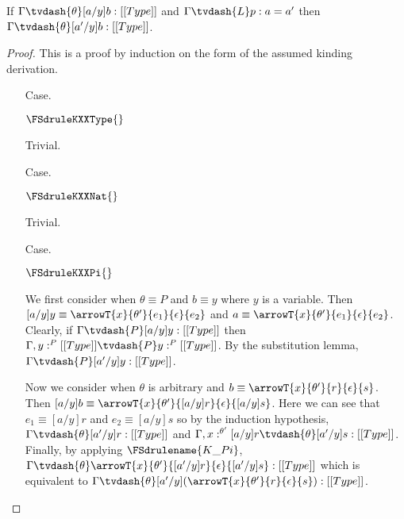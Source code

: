 \begin{lemma}
  \label{lemma:kinding_conversion}
  If $\Gamma \tvdash{\theta} [a/y]b:[[Type]]$ and $\Gamma \tvdash{L} p:a = a'$ then
  $\Gamma \tvdash{\theta} [a'/y]b:[[Type]]$.
\end{lemma}
\begin{proof}
  This is a proof by induction on the form of the assumed kinding derivation.
  \begin{itemize}
  \item[Case.] \ \\
    \begin{center}
      $\FSdruleKXXType{}$ 
    \end{center}
    Trivial.
    
  \item[Case.] \ \\
    \begin{center}
      $\FSdruleKXXNat{}$
    \end{center}
    Trivial.
    
  \item[Case.] \ \\
    \begin{center}
      $\FSdruleKXXPi{}$
    \end{center}
    We first consider when $\theta \equiv P$ and $b \equiv y$ where $y$ is a variable.  Then
    $[a/y]y \equiv \arrowT{x}{\theta'}{e_1}{\epsilon}{e_2}$ and 
    $a \equiv \arrowT{x}{\theta'}{e_1}{\epsilon}{e_2}$.  Clearly, if 
    $\Gamma \tvdash{P} [a/y]y:[[Type]]$ then $\Gamma, y:^P [[Type]] \tvdash{P} y:^P [[Type]]$.  By
    the substitution lemma, $\Gamma \tvdash{P} [a'/y]y:[[Type]]$.

    Now we consider when $\theta$ is arbitrary and 
    $b \equiv \arrowT{x}{\theta'}{r}{\epsilon}{s}$.
    Then $[a/y]b \equiv \arrowT{x}{\theta'}{[a/y]r}{\epsilon}{[a/y]s}$.  Here we can see that
    $e_1 \equiv [a/y]r$ and $e_2 \equiv [a/y]s$ so by the induction 
    hypothesis, $\Gamma \tvdash{\theta} [a'/y]r:[[Type]]$ and 
    $\Gamma, x:^{\theta'} [a/y]r \tvdash{\theta} [a'/y]s:[[Type]]$.  Finally, by applying 
    $\FSdrulename{K\_Pi}$, 
    $\Gamma \tvdash{\theta} \arrowT{x}{\theta'}{[a'/y]r}{\epsilon}{[a'/y]s}:[[Type]]$ which is 
    equivalent to 
    $\Gamma \tvdash{\theta} [a'/y](\arrowT{x}{\theta'}{r}{\epsilon}{s}):[[Type]]$.
  

\end{itemize}
\end{proof}
